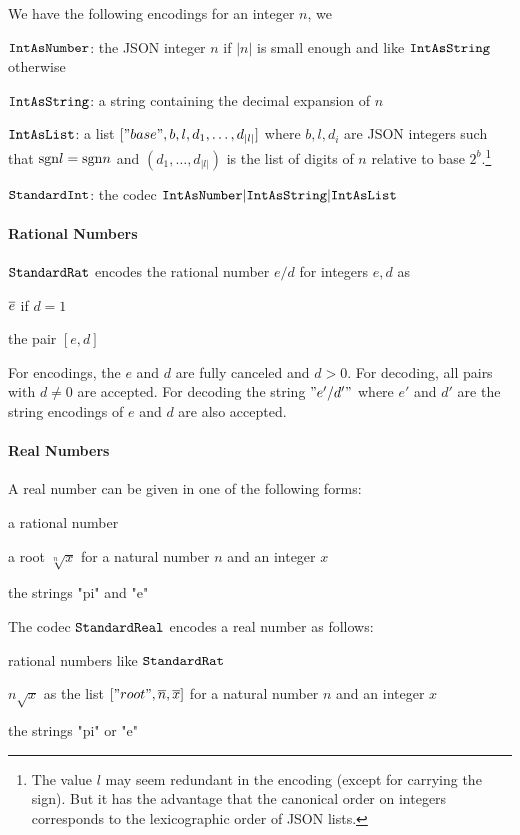 We have the following encodings for an integer $n$, we

$\cn{IntAsNumber}$: the JSON integer $n$ if $|n|$ is small enough and like $\cn{IntAsString}$ otherwise

$\cn{IntAsString}$: a string containing the decimal expansion of $n$

$\cn{IntAsList}$: a list $["base",b,l,d_1,\ldots,d_{|l|}]$ where $b,l,d_i$ are JSON integers such that $\sgn l=\sgn n$ and $(d_1,\ldots,d_|l|)$ is the list of digits of $n$ relative to base $2^b$.\footnote{The value $l$ may seem redundant in the encoding (except for carrying the sign). But it has the advantage that the canonical order on integers corresponds to the lexicographic order of JSON lists.}

$\cn{StandardInt}$: the codec $\cunion{\cn{IntAsNumber},\cn{IntAsString},\cn{IntAsList}}$

\paragraph{Rational Numbers}
$\cn{StandardRat}$ encodes the rational number $e/d$ for integers $e,d$ as
\begin{compactitem}
 \item $\ov{e}$ if $d=1$
 \item the pair $[e,d]$
\end{compactitem}
For encodings, the $e$ and $d$ are fully canceled and $d>0$. For decoding, all pairs with $d\neq 0$ are accepted.
For decoding the string $"e'/d'"$ where $e'$ and $d'$ are the string encodings of $e$ and $d$ are also accepted.

\paragraph{Real Numbers}
A real number can be given in one of the following forms:
\begin{compactitem}
 \item a rational number
 \item a root $\sqrt[n]{x}$ for a natural number $n$ and an integer $x$
 \item the strings "pi" and "e"
\end{compactitem}

The codec $\cn{StandardReal}$ encodes a real number as follows:
\begin{compactitem}
 \item rational numbers like $\cn{StandardRat}$
 \item $n\sqrt{x}$ as the list $["root",\ov{n},\ov{x}]$ for a natural number $n$ and an integer $x$
 \item the strings "pi" or "e"
\end{compactitem}

